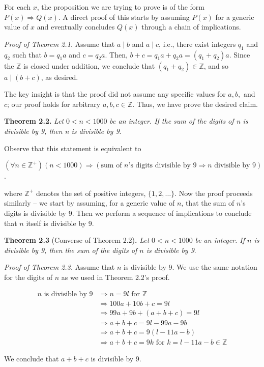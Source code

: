 \documentclass[12pt,a4paper]{article}
\begin{document}
For each $x$, the proposition we are trying to prove is of the form $P(x)\Rightarrow Q(x)$. A direct proof of this starts by assuming $P(x)$ for a generic value of $x$ and eventually concludes $Q(x)$ through a chain of implications.

\bigbreak

\textit{Proof of Theorem 2.1.} Assume that $a\mid b$ and $a\mid c$, i.e., there exist integers $q_1$ and $q_2$ such that $b=q_1a$ and $c=q_2a$. Then, $b+c=q_1a+q_2a=(q_1+q_2)a$. Since the $\mathbb{Z}$ is closed under addition, we conclude that $(q_1+q_2)\in\mathbb{Z}$, and so $a\mid(b+c)$, as desired.

\bigbreak

The key insight is that the proof did not assume any specific values for $a,b,$ and $c$; our proof holds for arbitrary $a,b,c\in\mathbb{Z}$. Thus, we have prove the desired claim.

\bigbreak

\textbf{Theorem 2.2.} \textit{Let} $0<n<1000$ \textit{be an integer. If the sum of the digits of n is divisible by 9, then n is divisible by 9}.

\bigbreak

Observe that this statement is equivalent to 
\begin{center}
	$(\forall n\in\mathbb{Z}^{+})(n<1000)\Rightarrow(\text{sum of }n\text{'s digits divisible by }9\Rightarrow n \text{ divisible by 9})$.
\end{center}
where $\mathbb{Z}^{+}$ denotes the set of positive integers, $\{1,2,\dots\}$. Now the proof proceeds similarly -- we start by assuming, for a generic value of $n$, that the sum of $n$'s digits is divisible by 9. Then we perform a sequence of implications to conclude that $n$ itself is divisible by 9.

\bigbreak

\textbf{Theorem 2.3} (Converse of Theorem 2.2)\textbf{.} \textit{Let} $0<n<1000$ \textit{be an integer. If $n$ is divisible by 9, then the sum of the digits of $n$ is divisible by 9}.

\bigbreak

\textit{Proof of Theorem 2.3.} Assume that $n$ is divisible by 9. We use the same notation for the digits of $n$ as we used in Theorem 2.2's proof.
\begin{center}
	\begin{align*}
		n \text{ is divisible by 9}&\Rightarrow n=9l \text{ for } \mathbb{Z} \\
		&\Rightarrow 100a+10b+c=9l \\
		&\Rightarrow 99a+9b+(a+b+c)=9l \\
		&\Rightarrow a+b+c=9l-99a-9b \\
		&\Rightarrow a+b+c=9(l-11a-b) \\
		&\Rightarrow a+b+c=9k \text{ for } k=l-11a-b\in\mathbb{Z}
	\end{align*}
\end{center}
We conclude that $a+b+c$ is divisible by 9.
\end{document}
